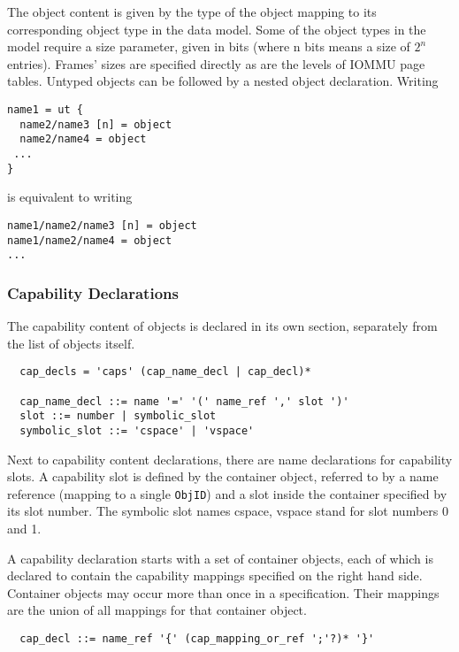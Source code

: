 \documentclass[a4paper,11pt]{article}
\begin{document}
The object content is given by the type of the object mapping to its 
corresponding object type in the data model. Some of the object types in the 
model require a size parameter, given in bits (where n bits means a size of 
$2^n$ entries). Frames' sizes are specified directly as are the levels of IOMMU 
page tables. Untyped objects can be followed by a nested object declaration. 
Writing 

\begin{verbatim}
name1 = ut {
  name2/name3 [n] = object
  name2/name4 = object
 ...
}
\end{verbatim}

is equivalent to writing

\begin{verbatim}
name1/name2/name3 [n] = object
name1/name2/name4 = object
...
\end{verbatim}


\subsubsection{Capability Declarations}

The capability content of objects is declared in its own section, separately from the list of objects itself.

\begin{verbatim}
  cap_decls = 'caps' (cap_name_decl | cap_decl)*

  cap_name_decl ::= name '=' '(' name_ref ',' slot ')'
  slot ::= number | symbolic_slot
  symbolic_slot ::= 'cspace' | 'vspace' 
\end{verbatim}

Next to capability content declarations, there are name declarations for capability slots. A capability slot is defined by the container object, referred to by a name reference (mapping to a single \texttt{ObjID}) and a slot inside the container specified by its slot number. The symbolic slot names cspace, vspace stand for slot numbers 0 and 1.

A capability declaration starts with a set of container objects, each of which is declared to contain the capability mappings specified on the right hand side. Container objects may occur more than once in a specification. Their mappings are the union of all mappings for that container object.

\begin{verbatim}
  cap_decl ::= name_ref '{' (cap_mapping_or_ref ';'?)* '}'
\end{verbatim}
\end{document}

